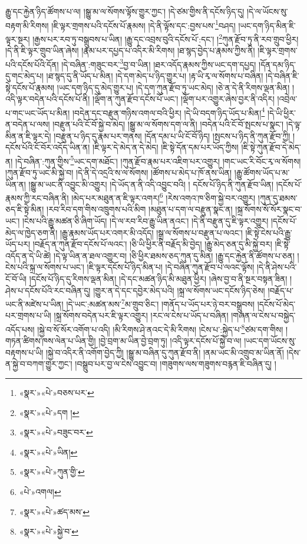 རྒྱུ་དང་རྐྱེན་ཉིད་ཚོགས་པ་ལ། །སྒྱུ་མ་ལ་སོགས་ལྟོས་གྱུར་ཀྱང་། །དེ་ཙམ་གྱིས་ནི་དངོས་ཉིད་དུ། །དེ་ལ་ཡོངས་སུ་བརྟག་མི་རིགས། །ཇི་ལྟར་གྲགས་པའི་དངོས་པོ་རྣམས། །དེ་ནི་ལྟོས་དང་:བྱས་པས་\footnote{«སྣར་»«པེ་»བཅས་པར་}བཤད། །ཡང་དག་ཉིད་མིན་ཇི་ལྟར་སྔར། །རྒྱས་པར་རབ་ཏུ་བསྒྲུབས་པ་ཡིན། །རྒྱུ་དང་འབྲས་བུའི་དངོས་པོ་:དང་། །\footnote{«སྣར་»«པེ་»དག །}ཀུན་རྫོབ་ཏུ་ནི་རབ་གྲུབ་ཕྱིར། །དེ་ནི་ཇི་ལྟར་གྲུབ་ཡིན་ཞེས། །རྣམ་པར་དཔྱད་པ་འདིར་མི་རིགས། །ཐ་སྙད་བྱེད་པ་རྣམས་ཀྱིས་ནི། །ཇི་ལྟར་གྲགས་པའི་དངོས་པོའི་དོན། །དེ་བཞིན་:གཟུང་བར་\footnote{«སྣར་»«པེ་»བཟུང་བར་}བྱ་བ་ཡིན། །ཐར་འདོད་རྣམས་ཀྱིས་ཡང་དག་དཔྱད། །དོན་དམ་ཉིད་དུ་གང་མེད་པ། །ཐ་སྙད་དུ་ནི་ཡོད་པ་མིན། །དེ་དག་མེད་པ་ཉིད་གྱུར་པ། །རྟ་ཡི་རྭ་ལ་སོགས་པ་བཞིན། །དེ་བཞིན་ཇི་སྟེ་དངོས་པོ་རྣམས། །ཡང་དག་ཉིད་དུ་མེད་གྱུར་པ། །དེ་དག་ཀུན་རྫོབ་ཏུ་ཡང་མེད། །ཅེ་ན་དེ་ནི་རིགས་ལྡན་མིན། །འདི་ལྟར་བདེན་པའི་དངོས་པོ་ནི། །ལྡོག་ན་ཀུན་རྫོབ་དངོས་པོ་ཡང་། །ལྡོག་པར་འགྱུར་ཞེས་བྱར་ནི་འདིར། །འབྲེལ་པ་གང་ཡང་ཡོད་པ་མིན། །བདེན་དང་བརྫུན་གཉིས་འགལ་བའི་ཕྱིར། །དེ་ཡི་བདག་ཉིད་ཡོད་པ་མིན།\footnote{«སྣར་»«པེ་»ཡིན།} །དེ་ཡི་ཕྱིར་ན་བདེན་པ་ལས། །བརྫུན་པའི་ངོ་བོ་སྐྱེ་བ་མེད། །སྒྱུ་མ་ལ་སོགས་དག་ལ་ནི། །བདེན་པའི་ངོ་བོ་སྤངས་པ་སྣང་། །དེ་ལྟ་མིན་ན་ཇི་ལྟར་དེ། །བརྫུན་པ་ཉིད་དུ་རྣམ་པར་གནས། །དོན་དམ་པ་ཡི་ངོ་བོ་ཉིད། །སྤངས་པ་ཉིད་ནི་ཀུན་རྫོབ་ཀྱི། །དངོས་པོའི་ངོ་བོར་འདོད་ཡིན་ན། །ཇི་ལྟར་དེ་མེད་ན་དེ་མེད། །ཇི་སྟེ་དོན་དམ་པར་ཡོད་ཀྱིས། །ཇི་སྟེ་ཀུན་རྫོབ་དེ་མེད་ན། །དེ་བཞིན་:ཀུན་གྱིས་\footnote{«སྣར་»«པེ་»ཀུན་གྱི་}ཡང་དག་མཐོང་། །ཀུན་རྫོབ་རྣམ་པར་འཇིག་པར་འགྱུར། །གང་ཡང་རི་བོང་རྭ་ལ་སོགས། །ཀུན་རྫོབ་ཏུ་ཡང་མི་སྐྱེ་བ། །དེ་ནི་དེ་འདྲའི་ས་ལ་སོགས། །ཚོགས་པ་མེད་པ་ཁོ་ནས་ཡིན། །རྒྱུ་ཚོགས་ཡོད་པ་མ་ཡིན་ན། །སྒྱུ་མ་ཡང་ནི་འབྱུང་མི་འགྱུར། །དེ་ཡོད་ན་ནི་འདི་འབྱུང་བའི། །
དངོས་པོ་ཉིད་ནི་ཀུན་རྫོབ་ཡིན། །དངོས་པོ་རྣམས་ཀྱི་རང་བཞིན་ནི། །མེད་པར་མཐུན་ན་ཇི་ལྟར་འགར།\footnote{«པེ་»འགལ།} །རེས་འགའ་ཁ་ཅིག་སྐྱེ་བར་འགྱུར། །ཀུན་དུ་ཐམས་ཅད་ཇི་སྟེ་མིན། །རབ་རིབ་དག་གིས་འཁྲུགས་པའི་མིག །མཐུན་པ་དག་ལ་བརྫུན་སྣང་ན། །སྐྲ་སོགས་སོ་སོར་སྣང་བ་ཡང་། །ངེས་པའི་རྒྱུ་མཚན་ཅི་ཞིག་ཡོད། །དེ་ལ་རབ་རིབ་རྒྱུ་ཡིན་ནའང་། །དེ་ནི་བརྫུན་དུ་ཇི་ལྟར་འགྱུར། །དངོས་པོ་མེད་ལ་ཁྱེད་ཅག་ནི། །རྒྱུ་རྣམས་ཡོད་པར་འགར་མི་འདོད། །སྒྲ་ལ་སོགས་པ་བརྫུན་པ་ལའང་། །ཇི་སྟེ་ངེས་པའི་རྒྱུ་ཡོད་པར། །བརྗོད་ན་ཀུན་རྫོབ་དངོས་པོ་ལའང་། །ཅི་ཡི་ཕྱིར་ནི་བརྗོད་མི་བྱེད། །རྒྱུ་མེད་ཅན་དུ་མི་སྐྱེ་བར། །ཇི་སྟེ་འདོད་ན་དེ་ཡི་ཚེ། །དེ་ལྟ་ཡིན་ན་ཐལ་འགྱུར་བ། །ཅི་ཕྱིར་ཐམས་ཅད་ཀུན་དུ་མིན། །རྒྱུ་དང་རྐྱེན་ནི་ཚོགས་པ་ཅན། །ངེས་པའི་སྐྲ་ལ་སོགས་པ་ཡང་། །ཇི་ལྟར་དངོས་པོ་ཉིད་མིན་པ། །དེ་བཞིན་ཀུན་རྫོབ་པ་ལའང་ལྟོས། །དེ་ནི་ཤེས་པའི་ངོ་བོ་ཡི། །དངོས་པོ་ཉིད་དུ་རིགས་ལྡན་མིན། །དེ་དང་མཚན་ཉིད་མི་མཐུན་ཕྱིར། །ཞེས་བྱ་བ་ནི་སྔར་བསྟན་ཟིན། །ཤེས་པ་དངོས་པོའི་རང་བཞིན་དུ། །གྱུར་ན་དེ་དང་དབྱེར་མེད་པའི། །སྐྲ་ལ་སོགས་ཡང་དངོས་ཉིད་ཅེས། །བརྗོད་པ་ཡང་ནི་མཛེས་པ་ཡིན། །དེ་ཡང་:མཚན་མས་\footnote{«སྣར་»«པེ་»ཚད་མས་}མ་གྲུབ་ཅིང་། །གནོད་པ་ཡོད་པར་ཉེ་བར་བསྒྲུབས། །དངོས་པོ་མེད་པར་གྲགས་པ་ཡི། །སྐྲ་སོགས་བདེན་པར་ཇི་ལྟར་འགྱུར། །རང་ལ་ངེས་པ་ཡོད་པ་བཞིན། །གཞན་ལ་ངེས་པ་བསྐྱེད་འདོད་པས། །སྐྱེ་བ་སོ་སོར་འགོག་པ་འདི། །མི་རིགས་ཤེ་ནའང་དེ་མི་རིགས། །ངེས་པ་:སྐྱེད་པ་\footnote{«སྣར་»«པེ་»སྐྱེ་བ་}ཙམ་དག་གིས། །གཏན་ཚིགས་ཁས་ལེན་པ་ཡིན་གྱི། །བྱེ་བྲག་མ་ཡིན་བྱེ་བྲག་ཏུ། །འདི་ལྟར་དངོས་པོ་སྐྱེ་བ་ལ། །ཡང་དག་ཡོངས་སུ་བརྟགས་པ་ཡི། །སྐྱེ་བ་འདིར་ནི་འགོག་བྱེད་ཀྱི། །སྒྱུ་མ་བཞིན་དུ་ཀུན་རྫོབ་ནི། །ནམ་ཡང་མི་འགྲུབ་མ་ཡིན་ནོ། །དེས་ན་སྐྱེ་བ་བཀག་གྱུར་ཀྱང་། །བསྒྲུབ་པར་བྱ་ལ་ངེས་འབྱུང་བ། །གཟུགས་ལས་གཟུགས་བརྙན་ཇི་བཞིན་དུ། །
